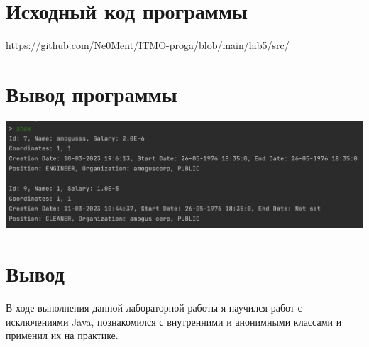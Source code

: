 \documentclass[12pt,onecolumn]{article}
\begin{document}
\section{Исходный код программы}
https://github.com/Ne0Ment/ITMO-proga/blob/main/lab5/src/

\section{Вывод программы}
\includegraphics[width=\columnwidth]{imgs/out_lab5.png}

\section{Вывод}
В ходе выполнения данной лабораторной работы я научился работ с исключениями Java, познакомился с внутренними и анонимными классами и применил их на практике. \\
\end{document}
